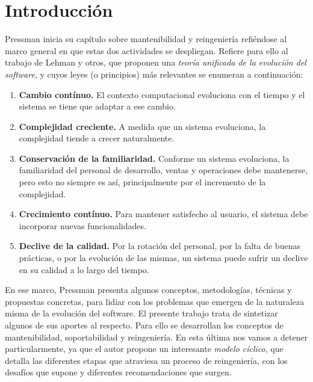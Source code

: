 \section{Introducción}

Pressman inicia su capítulo sobre mantenibilidad y reingeniería 
refiéndose al marco general en que estas dos actividades se despliegan. 
Refiere para ello al trabajo de Lehman y otros,
que proponen una \textit{teoría unificada de la evolución del software},
y cuyos leyes (o principios) más relevantes se enumeran a continuación:

\begin{enumerate}
    \item \textbf{Cambio contínuo.}
    El contexto computacional evoluciona con el tiempo y el sistema se tiene que
    adaptar a ese cambio.
    \item \textbf{Complejidad creciente.}
    A medida que un sistema evoluciona, la complejidad tiende a crecer 
    naturalmente.
    \item \textbf{Conservación de la familiaridad.}
    Conforme un sistema evoluciona, la familiaridad del personal de desarrollo,
    ventas y operaciones debe mantenerse, pero esto no siempre es así,
    principalmente por el incremento de la complejidad.
    \item \textbf{Crecimiento contínuo.}
    Para mantener satisfecho al usuario, el sistema debe incorporar nuevas 
    funcionalidades.
    \item \textbf{Declive de la calidad.}
    Por la rotación del personal, 
    por la falta de buenas prácticas,
    o por la evolución de las mismas,
    un sistema puede sufrir un declive en su calidad a lo largo del tiempo.
\end{enumerate}

En ese marco, Pressman presenta algunos conceptos, 
metodologías, técnicas y propuestas concretas,
para lidiar con los problemas que emergen de la naturaleza misma de la 
evolución del software.
El presente trabajo trata de sintetizar algunos de sus aportes al respecto.
Para ello se desarrollan los conceptos de mantenibilidad,
soportabilidad y reingeniería.
En esta última nos vamos a detener particularmente,
ya que el autor propone un interesante \textit{modelo cíclico},
que detalla las diferentes etapas que atraviesa un proceso de reingeniería,
con los desafíos que supone y diferentes recomendaciones que surgen.